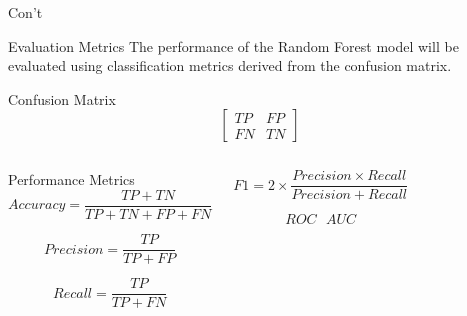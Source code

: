 \documentclass[10pt]{beamer}
\begin{document}
\begin{frame}{Con't}
	
	\small
	
	\begin{block}{Evaluation Metrics}
		The performance of the Random Forest model will be evaluated using classification metrics derived from the confusion matrix.
	\end{block}
	
	\vspace{0.2cm}
	
	\begin{exampleblock}{Confusion Matrix}
		\[
		\begin{bmatrix}
			TP & FP \\
			FN & TN
		\end{bmatrix}
		\]
	\end{exampleblock}
	
	\vspace{0.2cm}
	
	\begin{columns}
		
		
		\begin{alertblock}{Performance Metrics}
			\[
			Accuracy = \frac{TP+TN}{TP+TN+FP+FN}
			\]
			
			\[
			Precision = \frac{TP}{TP+FP}
			\]
			
			\[
			Recall = \frac{TP}{TP+FN}
			\]
		\end{alertblock}
		
		
		\begin{exampleblock}{ }
			\[
			F1 = 2 \times \frac{Precision \times Recall}{Precision+Recall}
			\]
			
			\[
		 	ROC\text{ }AUC
			\]
		
		\end{exampleblock}
		
	\end{columns}
	
\end{frame}
\end{document}
